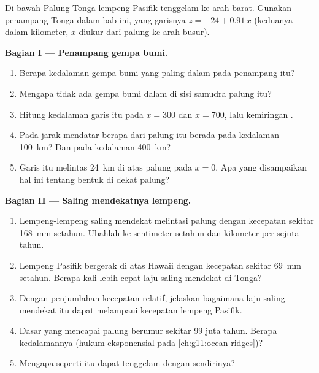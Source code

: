 \begin{problem}
\label{pb:g11:subduction-zones:1}
Di bawah Palung Tonga lempeng Pasifik tenggelam ke arah barat. Gunakan penampang
Tonga dalam bab ini, yang garisnya $z = -24 + 0.91\,x$ (keduanya dalam
kilometer, $x$ diukur dari palung ke arah busur).

\medskip
\noindent\textbf{Bagian I --- Penampang gempa bumi.}
\begin{enumerate}
  \item Berapa kedalaman gempa bumi yang paling dalam pada penampang itu?
  \item Mengapa tidak ada gempa bumi dalam di sisi samudra palung itu?
  \item Hitung kedalaman garis itu pada $x = 300$ dan $x = 700$, lalu
        kemiringan .
  \item Pada jarak mendatar berapa dari palung  itu berada pada
        kedalaman \qty{100}{km}? Dan pada kedalaman \qty{400}{km}?
  \item Garis itu melintas \qty{24}{km} di atas palung pada $x = 0$. Apa yang
        disampaikan hal ini tentang bentuk  di dekat palung?
\end{enumerate}

\medskip
\noindent\textbf{Bagian II --- Saling mendekatnya lempeng.}
\begin{enumerate}[resume]
  \item Lempeng-lempeng saling mendekat melintasi palung dengan kecepatan sekitar
        \qty{168}{mm} setahun. Ubahlah ke sentimeter setahun dan kilometer per
        sejuta tahun.
  \item Lempeng Pasifik bergerak di atas Hawaii dengan kecepatan sekitar
        \qty{69}{mm} setahun. Berapa kali lebih cepat laju saling mendekat di
        Tonga?
  \item Dengan penjumlahan kecepatan relatif, jelaskan bagaimana laju saling
        mendekat itu dapat melampaui kecepatan lempeng Pasifik.
  \item Dasar yang mencapai palung berumur sekitar 99 juta tahun. Berapa
        kedalamannya (hukum eksponensial pada \cref{ch:g11:ocean-ridges})?
  \item Mengapa  seperti itu dapat tenggelam dengan sendirinya?
\end{enumerate}


\end{problem}
